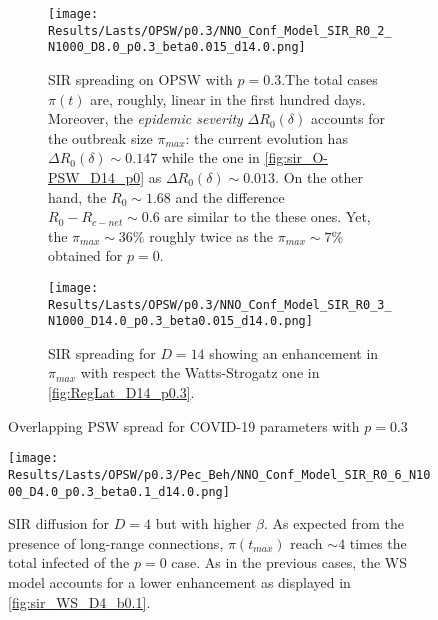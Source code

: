 \documentclass[a4paper,10pt,twoside]{book} %
\theoremstyle{definition}
\begin{document}
\begin{figure}[htbp]
	\centering
	\begin{subfigure}[t]{\linewidth}
		\centering
		\texttt{[image: Results/Lasts/OPSW/p0.3/NNO\_Conf\_Model\_SIR\_R0\_2\_N1000\_D8.0\_p0.3\_beta0.015\_d14.0.png]}
		\caption{SIR spreading on OPSW with $ p = 0.3$.The total cases $ \pi(t)$ are, roughly, linear in the first hundred days. Moreover, the \textit{epidemic severity} $ \Delta R_0(\delta)$  accounts for the outbreak size $ \pi_{max}$: the current evolution has $\Delta R_0(\delta) \sim 0.147$ while the one in \autoref{fig:sir_O-PSW_D14_p0} as $ \Delta R_0(\delta) \sim 0.013$. On the other hand, the $R_0 \sim 1.68$ and the difference $R_0 - R_{c-net} \sim 0.6$ are similar to the these ones. Yet, the $\pi_{max} \sim 36\%$ roughly twice as the $\pi_{max} \sim 7\%$ obtained for $ p = 0$.}
		\label{fig:sir_O-PSW_D8_p0.3}
	\end{subfigure}
	\begin{subfigure}[t]{\linewidth}
		\centering
		\texttt{[image: Results/Lasts/OPSW/p0.3/NNO\_Conf\_Model\_SIR\_R0\_3\_N1000\_D14.0\_p0.3\_beta0.015\_d14.0.png]}
		\caption{SIR spreading for $ D = 14$ showing an enhancement in $ \pi_{max} $ with respect the Watts-Strogatz one in \autoref{fig:RegLat_D14_p0.3}.}
		\label{fig:sir_O-PSW_D14_p0.3}
	\end{subfigure}
	\caption{Overlapping PSW spread for COVID-19 parameters with $p = 0.3$ }
\end{figure}

\begin{figure}[H]
	\centering
	\texttt{[image: Results/Lasts/OPSW/p0.3/Pec\_Beh/NNO\_Conf\_Model\_SIR\_R0\_6\_N1000\_D4.0\_p0.3\_beta0.1\_d14.0.png]}
	\caption{SIR diffusion for $ D = 4$ but with higher $\beta$. As expected from the presence of long-range connections, $\pi(t_{max})$ reach $\sim 4$ times the total infected of the $ p=0$ case. As in the previous cases, the WS model accounts for a lower enhancement as displayed in \autoref{fig:sir_WS_D4_b0.1}.}
	\label{fig:sir_O-PSW_D8_b0.1}
\end{figure}

\clearpage
\end{document}
